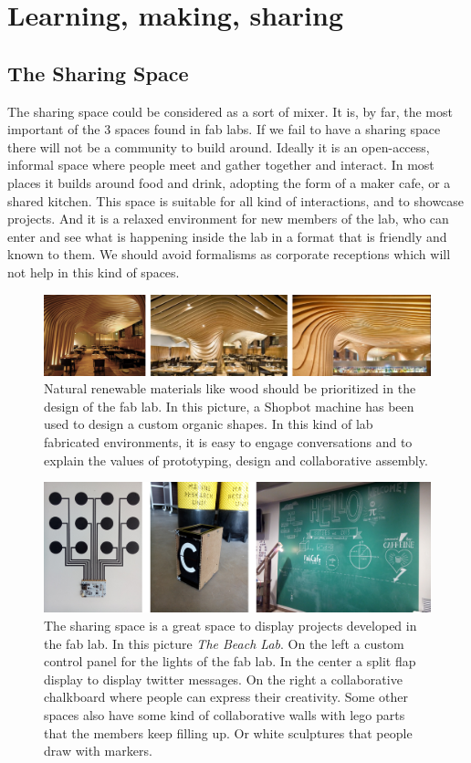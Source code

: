 \documentclass[a4paper,12pt,titlepage]{article}
\begin{document}
\clearpage
\section{Learning, making, sharing}
\subsection{The Sharing Space}
The sharing space could be considered as a sort of mixer. It is, by far, the
most important of the 3 spaces
found in fab labs. If we fail to
have a sharing space there will
not be a community to build
around. Ideally it is an open-access, informal space where
people meet and gather
together and interact. In most
places it builds around food
and drink, adopting the form of
a maker cafe, or a shared
kitchen. This space is suitable
for all kind of interactions, and
to showcase projects. And it is
a relaxed environment for new
members of the lab, who can
enter and see what is
happening inside the lab in a
format that is friendly and
known to them. We should
avoid formalisms as corporate
receptions which will not help
in this kind of spaces.

\begin{figure}[h] %
   \centering
   \includegraphics[width=16cm]{files/roof} 
   \caption{Natural renewable materials like wood should be prioritized in the design of the fab lab.
In this picture, a Shopbot machine has been used to design a custom organic shapes. In
this kind of lab fabricated environments, it is easy to engage conversations and to
explain the values of prototyping, design and collaborative assembly.}
\end{figure}

\begin{figure}[h] %
   \centering
   \includegraphics[width=16cm]{files/sharing2} 
   \caption{The sharing space is a great space to display projects developed in the fab lab. In this
picture \textit{The Beach Lab}. On the left a custom control panel for the lights of the fab lab.
In the center a split flap display to display twitter messages. On the right a collaborative
chalkboard where people can express their creativity. Some other spaces also have
some kind of collaborative walls with lego parts that the members keep filling up. Or white sculptures that people draw with markers.}
\end{figure}
\end{document}
